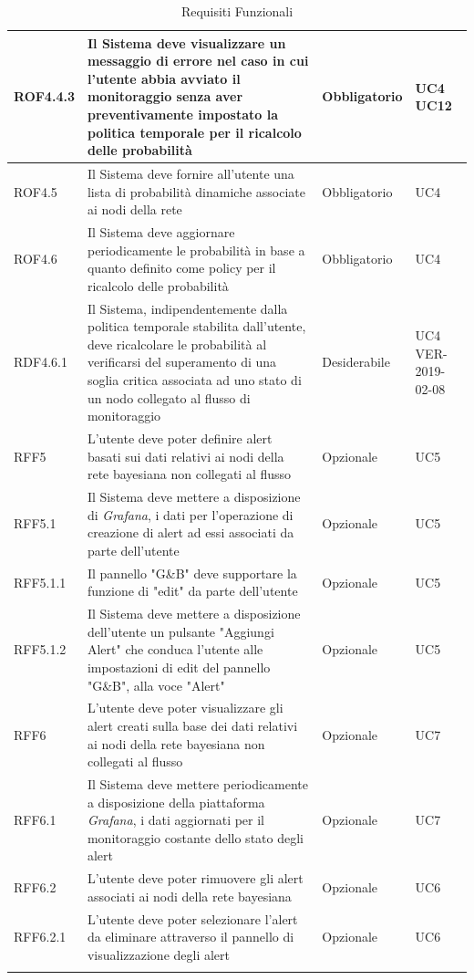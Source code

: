 \begin{center}
\begin{longtable}[c]{|m{}|m{}|m{}|m{}|}
\hline
ROF4.4.3 & Il Sistema deve visualizzare un messaggio di errore nel caso in cui l'utente abbia avviato il monitoraggio senza aver preventivamente impostato la politica temporale per il ricalcolo delle probabilità & Obbligatorio & UC4 UC12\\
\hline
\rowcolor{grigio}ROF4.5 & Il Sistema deve fornire all'utente una lista di probabilità dinamiche associate ai nodi della rete & Obbligatorio & UC4\\
\hline
ROF4.6 & Il Sistema deve aggiornare periodicamente le probabilità in base a quanto definito come policy per il ricalcolo delle probabilità & Obbligatorio & UC4\\
\hline
\rowcolor{grigio}RDF4.6.1 & Il Sistema, indipendentemente dalla politica temporale stabilita dall'utente, deve ricalcolare le probabilità al verificarsi del superamento di una soglia critica associata ad uno stato di un nodo collegato al flusso di monitoraggio & Desiderabile & UC4 VER-2019-02-08\\
\hline
RFF5 & L'utente deve poter definire alert basati sui dati relativi ai nodi della rete bayesiana non collegati al flusso & Opzionale & UC5\\
\hline
\rowcolor{grigio}RFF5.1 & Il Sistema deve mettere a disposizione di \textit{Grafana}, i dati per l'operazione di creazione di alert ad essi associati da parte dell'utente & Opzionale & UC5\\
\hline
RFF5.1.1 & Il pannello "G\&B" deve supportare la funzione di "edit" da parte dell'utente & Opzionale & UC5\\
\hline
\rowcolor{grigio}RFF5.1.2 & Il Sistema deve mettere a disposizione dell'utente un pulsante "Aggiungi Alert" che conduca l'utente alle impostazioni di edit del pannello "G\&B", alla voce "Alert" & Opzionale & UC5\\
\hline
RFF6 & L'utente deve poter visualizzare gli alert creati sulla base dei dati relativi ai nodi della rete bayesiana non collegati al flusso & Opzionale & UC7\\ 
\hline
\rowcolor{grigio}RFF6.1 & Il Sistema deve mettere periodicamente a disposizione della piattaforma \textit{Grafana}, i dati aggiornati per il monitoraggio costante dello stato degli alert & Opzionale & UC7\\
\hline
RFF6.2 & L'utente deve poter rimuovere gli alert associati ai nodi della rete bayesiana & Opzionale & UC6\\
\hline
\rowcolor{grigio}RFF6.2.1 & L'utente deve poter selezionare l'alert da eliminare attraverso il pannello di visualizzazione degli alert & Opzionale & UC6\\
\hline
\caption{Requisiti Funzionali}
\end{longtable}
\end{center}


